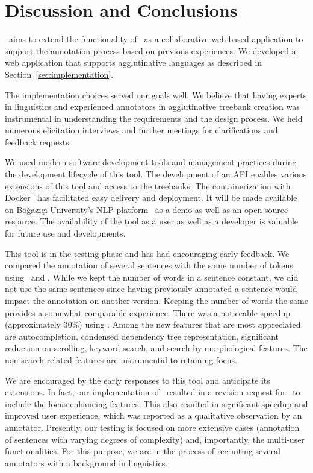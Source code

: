 \section{Discussion and Conclusions}
\label{sec:discussion}

\boatvtwo\ aims to extend the functionality of \boatvone\ as a collaborative web-based application to support the annotation process based on previous experiences.
We developed a web application that supports agglutinative languages as described in Section~\ref{sec:implementation}.

The implementation choices served our goals well.
We believe that having experts in linguistics and experienced annotators in agglutinative treebank creation was instrumental in understanding the requirements and the design process.
We held numerous elicitation interviews and further meetings for clarifications and feedback requests.

We used modern software development tools and management practices during the development lifecycle of this tool.
The development of an API enables various extensions of this tool and access to the treebanks.
The containerization with Docker~\cite{docker} has facilitated easy delivery and deployment.
It will be made available on Boğaziçi University's NLP platform~\cite{DIP} as a demo as well as an open-source resource.
The availability of the tool as a user as well as a developer is valuable for future use and developments.

This tool is in the testing phase and has had encouraging early feedback.
We compared the annotation of several sentences with the same number of tokens using \boatvone\ and \boatvtwo.
While we kept the number of words in a sentence constant, we did not use the same sentences since having previously annotated a sentence would impact the annotation on another version.
Keeping the number of words the same provides a somewhat comparable experience.
There was a noticeable speedup (approximately 30\%) using \boatvtwo.
Among the new features that are most appreciated are autocompletion, condensed dependency tree representation, significant reduction on scrolling, keyword search, and search by morphological features.
The non-search related features are instrumental to retaining focus.

We are encouraged by the early responses to this tool and anticipate its extensions.
In fact, our implementation of \boatvtwo\ resulted in a revision request for \boatvone\ to include the focus enhancing features.
This also resulted in significant speedup and improved user experience, which was reported as a qualitative observation by an annotator.
Presently, our testing is focused on more extensive cases (annotation of sentences with varying degrees of complexity) and, importantly, the multi-user functionalities.
For this purpose, we are in the process of recruiting several annotators with a background in linguistics.
